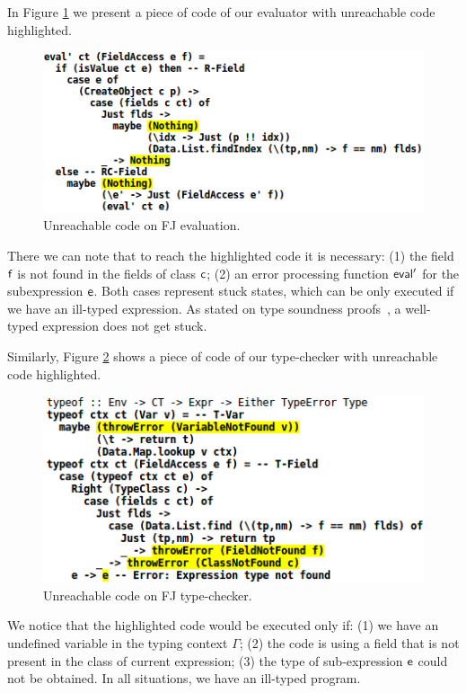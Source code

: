 \documentclass[tese,capa,english]{texufpel}
\newcommand{\V}[1]{\black{\mathsf{#1}}}
\newcommand{\HFun}[1]{\blue{\mathsf{#1}}}
\begin{document}
In Figure \ref{fig:fj-eval} we present a piece of code of our evaluator with unreachable code highlighted.

\begin{figure}[!htb]
\centering
\includegraphics[width=0.70\linewidth]{Images/eval_fj}
\caption{Unreachable code on FJ evaluation.}
\label{fig:fj-eval}
\end{figure}

There we can note that to reach the highlighted code it is necessary: (1) the field \ensuremath{\V{f}} is not found in the fields of class \ensuremath{\V{c}}; (2) an error processing function \ensuremath{\HFun{eval'}} for the subexpression \ensuremath{\V{e}}. Both cases represent stuck states, which can be only executed if we have an ill-typed expression. As stated on type soundness proofs~\cite{Igarashi:2001:FJM:503502.503505}, a well-typed expression does not get stuck.

Similarly, Figure \ref{fig:typeof} shows a piece of code of our type-checker with unreachable code highlighted.

\begin{figure}[!htb]
\centering
\includegraphics[width=0.68\linewidth]{Images/typeof_fj}
\caption{Unreachable code on FJ type-checker.}
\label{fig:typeof}
\end{figure}

We notice that the highlighted code would be executed only if: (1) we have an undefined variable in the typing context $\Gamma$; (2) the code is using a field that is not present in the class of current expression; (3) the type of sub-expression \ensuremath{\V{e}} could not be obtained. In all situations, we have an ill-typed program.
\end{document}
